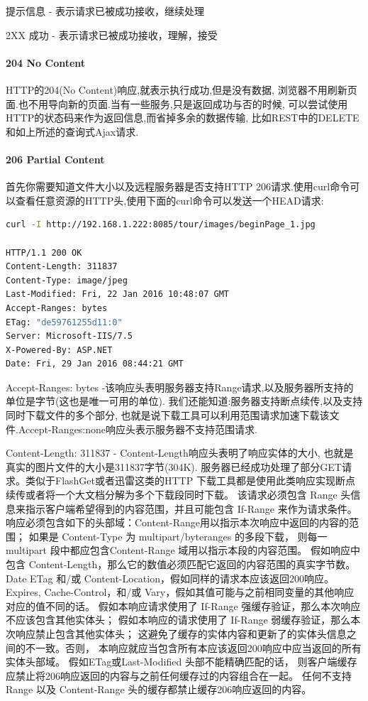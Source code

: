 \documentclass{book}
\begin{document}
提示信息 - 表示请求已被成功接收，继续处理

2XX  成功 - 表示请求已被成功接收，理解，接受

\paragraph{204 No Content}HTTP的204(No Content)响应,就表示执行成功,但是没有数据, 浏览器不用刷新页面.也不用导向新的页面.当有一些服务,只是返回成功与否的时候,
可以尝试使用HTTP的状态码来作为返回信息,而省掉多余的数据传输,
比如REST中的DELETE和如上所述的查询式Ajax请求.

\paragraph{206 Partial Content}首先你需要知道文件大小以及远程服务器是否支持HTTP 206请求.使用curl命令可以查看任意资源的HTTP头,使用下面的curl命令可以发送一个HEAD请求:

\begin{lstlisting}[language=Bash]
curl -I http://192.168.1.222:8085/tour/images/beginPage_1.jpg

HTTP/1.1 200 OK
Content-Length: 311837
Content-Type: image/jpeg
Last-Modified: Fri, 22 Jan 2016 10:48:07 GMT
Accept-Ranges: bytes
ETag: "de59761255d11:0"
Server: Microsoft-IIS/7.5
X-Powered-By: ASP.NET
Date: Fri, 29 Jan 2016 08:44:21 GMT
\end{lstlisting}

Accept-Ranges: bytes -该响应头表明服务器支持Range请求,以及服务器所支持的单位是字节(这也是唯一可用的单位).
我们还能知道:服务器支持断点续传,以及支持同时下载文件的多个部分,
也就是说下载工具可以利用范围请求加速下载该文件.Accept-Ranges:none响应头表示服务器不支持范围请求.

Content-Length: 311837 - Content-Length响应头表明了响应实体的大小,
也就是真实的图片文件的大小是311837字节(304K).
服务器已经成功处理了部分GET请求。类似于FlashGet或者迅雷这类的HTTP
下载工具都是使用此类响应实现断点续传或者将一个大文档分解为多个下载段同时下载。
该请求必须包含 Range 头信息来指示客户端希望得到的内容范围，并且可能包含 If-Range
来作为请求条件。响应必须包含如下的头部域：Content-Range用以指示本次响应中返回的内容的范围；
如果是 Content-Type 为 multipart/byteranges 的多段下载，
则每一 multipart 段中都应包含Content-Range 域用以指示本段的内容范围。
假如响应中包含 Content-Length，那么它的数值必须匹配它返回的内容范围的真实字节数。
Date ETag 和/或 Content-Location，假如同样的请求本应该返回200响应。
Expires, Cache-Control，和/或 Vary，假如其值可能与之前相同变量的其他响应对应的值不同的话。
假如本响应请求使用了 If-Range 强缓存验证，那么本次响应不应该包含其他实体头；
假如本响应的请求使用了 If-Range 弱缓存验证，那么本次响应禁止包含其他实体头；
这避免了缓存的实体内容和更新了的实体头信息之间的不一致。否则，
本响应就应当包含所有本应该返回200响应中应当返回的所有实体头部域。
假如ETag或Last-Modified 头部不能精确匹配的话，
则客户端缓存应禁止将206响应返回的内容与之前任何缓存过的内容组合在一起。
任何不支持 Range 以及 Content-Range 头的缓存都禁止缓存206响应返回的内容。
\end{document}
